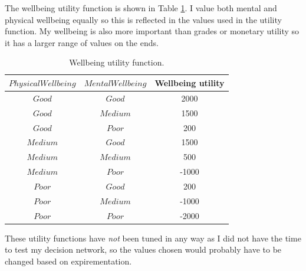 \documentclass[11pt, a4paper, english]{../Template/NTNUoving}
\begin{document}
\begin{oppgave}
    The wellbeing utility function is shown in Table \ref{tab:WU}. I value both mental and physical wellbeing equally so this is reflected
    in the values used in the utility function. My wellbeing is also more important than grades or monetary utility so it has a larger range of values on the ends.

    \begin{table}[H]
        \centering
        \begin{tabular}{|c|c|c|}
            \hline
            $PhysicalWellbeing$ & $MentalWellbeing$ & Wellbeing utility  \\
            \hline
            $Good$ & $Good$ & 2000 \\ [1.0ex]
            $Good$ & $Medium$ & 1500 \\ [1.0ex]
            $Good$ & $Poor$ & 200 \\ [1.0ex]
            $Medium$ & $Good$ & 1500 \\ [1.0ex]
            $Medium$ & $Medium$ & 500 \\ [1.0ex]
            $Medium$ & $Poor$ & -1000 \\ [1.0ex]
            $Poor$ & $Good$ & 200 \\ [1.0ex]
            $Poor$ & $Medium$ & -1000 \\ [1.0ex]
            $Poor$ & $Poor$ & -2000 \\ [1.0ex]
            \hline
        \end{tabular}
        \caption{Wellbeing utility function.}
        \label{tab:WU}
    \end{table}

    These utility functions have \textit{not} been tuned in any way as I did not have the time to test my decision network, so the
    values chosen would probably have to be changed based on expirementation.

\printbibliography

\end{oppgave}
\end{document}
